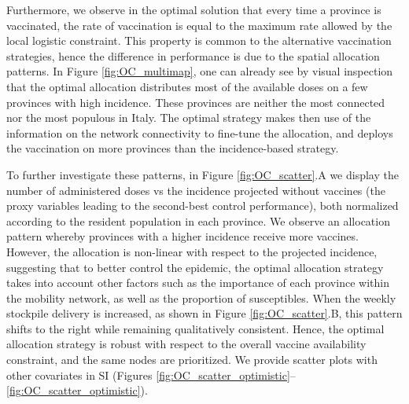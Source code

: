 Furthermore, we observe in the optimal solution that every time a province is vaccinated, the rate of vaccination is equal to the maximum rate allowed by the local logistic constraint. This property is common to the alternative vaccination strategies, hence the difference in performance is due to the spatial allocation patterns.%
In Figure \ref{fig:OC_multimap}, one can already see by visual inspection that the optimal allocation distributes most of the available doses on a few provinces with high incidence. These provinces are neither the most connected nor the most populous in Italy. The optimal strategy makes then use of the information on the network connectivity to fine-tune the allocation, and deploys the vaccination on more provinces than the incidence-based strategy. %

To further investigate these patterns, in Figure \ref{fig:OC_scatter}.A we display the number of administered doses vs the incidence projected without vaccines (the proxy variables leading to the second-best control performance), both normalized according to the resident population in each province. We observe an allocation pattern whereby provinces with a higher incidence receive more vaccines. However, the allocation is non-linear with respect to the projected incidence, suggesting that to better control the epidemic, the optimal allocation strategy takes into account other factors such as the importance of each province within the mobility network, as well as the proportion of susceptibles. When the weekly stockpile delivery is increased, as shown in Figure \ref{fig:OC_scatter}.B, this pattern shifts to the right while remaining qualitatively consistent. Hence, the optimal allocation strategy is robust with respect to the overall vaccine availability constraint, and the same nodes are prioritized. We provide scatter plots with other covariates in SI (Figures \ref{fig:OC_scatter_optimistic}--\ref{fig:OC_scatter_optimistic}). 

